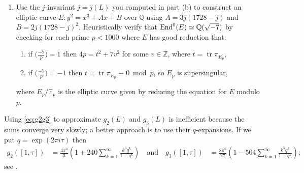 \documentclass[11pt]{article}
\newcommand{\F}{\mathbb{F}}
\newcommand{\Q}{\mathbb{Q}}
\newcommand{\Z}{\mathbb{Z}}
\newcommand{\End}{{\rm End}}
\newcommand{\tr}{\operatorname{tr}}
\begin{document}
\begin{enumerate}[{\bf (a)}]
\item
Use the $j$-invariant $j=j(L)$ you computed in part (b) to construct an elliptic curve $E\colon y^2 = x^3+Ax+B$ over $\Q$ using
$A=3j(1728-j)$ and $B=2j(1728-j)^2$.
Heuristically verify that $\End^0(E)\simeq \Q(\sqrt{-7})$ by checking for each prime $p<1000$ where $E$ has good reduction that:
\begin{enumerate}
\item[(i)] if $\bigl(\frac{-7}{p}\bigr)=1$ then $4p=t^2+7v^2$ for some $v\in \Z$, where $t=\tr\pi_{E_p}$,
\item[(ii)] if $\bigl(\frac{-7}{p}\bigr)=-1$ then $t=\tr\pi_{E_p}\equiv 0\bmod p$, so $E_p$ is supersingular,
\end{enumerate}
where $E_p/\F_p$ is the elliptic curve given by reducing the equation for $E$ modulo $p$.

\end{enumerate}

\noindent
Using \eqref{eq:g2g3} to approximate $g_2(L)$ and $g_3(L)$ is inefficient because the sums converge very slowly;
a better approach is to use their $q$-expansions.  If we put $q=\exp(2\pi i \tau)$ then
\begin{align*}
g_2([1,\tau])&=\frac{4\pi^4}{3}\left(1 + 240 \sum_{k=1}^\infty\frac{k^3q^k}{1-q^k}\right)\quad\text{and}\quad
g_3([1,\tau])&=\frac{8\pi^6}{27}\left(1 - 504 \sum_{k=1}^\infty\frac{k^5q^k}{1-q^k}\right);
\end{align*}
see \cite[p.\ 275]{washington}.
\end{document}

